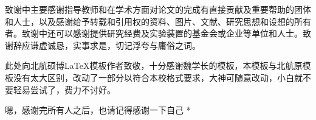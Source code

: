 \acknowledgments

致谢中主要感谢指导教师和在学术方面对论文的完成有直接贡献及重要帮助的团体和人士，以及感谢给予转载和引用权的资料、图片、文献、研究思想和设想的所有者。致谢中还可以感谢提供研究经费及实验装置的基金会或企业等单位和人士。致谢辞应谦虚诚恳，实事求是，切记浮夸与庸俗之词。

此处向北航硕博\LaTeX 模板作者致敬，十分感谢魏学长的模板，本模板与北航原模板没有太大区别，改动了一部分以符合本校格式要求，大神可随意改动，小白就不要轻易尝试了，费力不讨好。
\par * 嗯，感谢完所有人之后，也请记得感谢一下自己 * \par